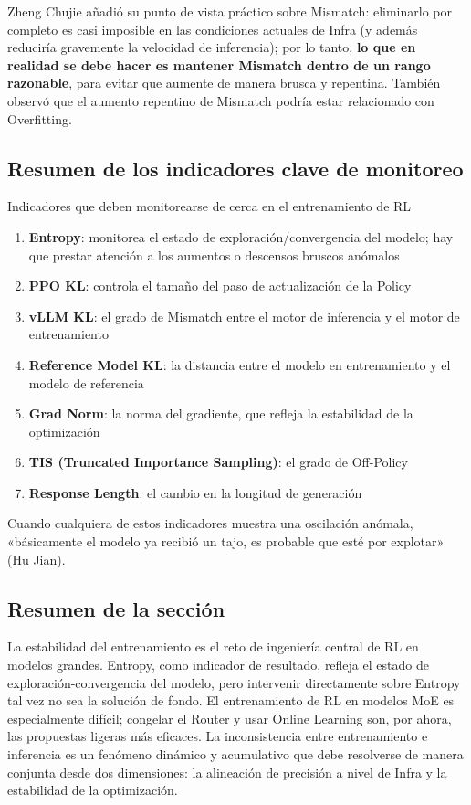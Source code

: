 \documentclass[a4paper]{article}
\begin{document}
Zheng Chujie añadió su punto de vista práctico sobre Mismatch: eliminarlo por completo es casi imposible en las condiciones actuales de Infra (y además reduciría gravemente la velocidad de inferencia); por lo tanto, \textbf{lo que en realidad se debe hacer es mantener Mismatch dentro de un rango razonable}, para evitar que aumente de manera brusca y repentina. También observó que el aumento repentino de Mismatch podría estar relacionado con Overfitting.

\subsection{Resumen de los indicadores clave de monitoreo}

\begin{importantbox}{Indicadores que deben monitorearse de cerca en el entrenamiento de RL}
\begin{enumerate}
    \item \textbf{Entropy}: monitorea el estado de exploración/convergencia del modelo; hay que prestar atención a los aumentos o descensos bruscos anómalos
    \item \textbf{PPO KL}: controla el tamaño del paso de actualización de la Policy
    \item \textbf{vLLM KL}: el grado de Mismatch entre el motor de inferencia y el motor de entrenamiento
    \item \textbf{Reference Model KL}: la distancia entre el modelo en entrenamiento y el modelo de referencia
    \item \textbf{Grad Norm}: la norma del gradiente, que refleja la estabilidad de la optimización
    \item \textbf{TIS (Truncated Importance Sampling)}: el grado de Off-Policy
    \item \textbf{Response Length}: el cambio en la longitud de generación
\end{enumerate}
Cuando cualquiera de estos indicadores muestra una oscilación anómala, «básicamente el modelo ya recibió un tajo, es probable que esté por explotar» (Hu Jian).
\end{importantbox}

\subsection{Resumen de la sección}

La estabilidad del entrenamiento es el reto de ingeniería central de RL en modelos grandes. Entropy, como indicador de resultado, refleja el estado de exploración-convergencia del modelo, pero intervenir directamente sobre Entropy tal vez no sea la solución de fondo. El entrenamiento de RL en modelos MoE es especialmente difícil; congelar el Router y usar Online Learning son, por ahora, las propuestas ligeras más eficaces. La inconsistencia entre entrenamiento e inferencia es un fenómeno dinámico y acumulativo que debe resolverse de manera conjunta desde dos dimensiones: la alineación de precisión a nivel de Infra y la estabilidad de la optimización.
\end{document}
